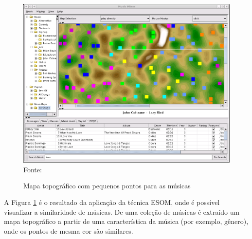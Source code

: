 \begin{figure}[!htb]
   \centering
   \caption{Mapa topográfico com pequenos pontos para as músicas}\label{fig:mapaTopografico}
   \includegraphics[scale=0.40]{figuras/musicminerMap.png}
   \\Fonte: \cite{musicminer}
\end{figure}

A Figura \ref{fig:mapaTopografico} é o resultado da aplicação da técnica ESOM, onde é possível visualizar a similaridade de músicas. De uma coleção de músicas é extraído um mapa topográfico a partir de uma característica da música (por exemplo, gênero), onde os pontos de mesma cor são similares.
